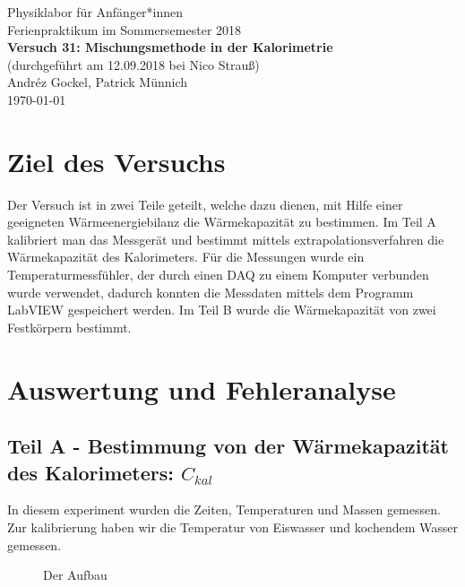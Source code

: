 \documentclass[11pt,a4paper]{article}
\begin{document}
{
\centering 
\large 
Physiklabor für Anf\"anger*innen \\
Ferienpraktikum im Sommersemester 2018 \\[4mm]
\textbf{\LARGE 
Versuch 31: Mischungsmethode in der Kalorimetrie
} \\[3mm]
(durchgef\"uhrt am 12.09.2018 bei Nico Strauß) \\
Andréz Gockel, Patrick M\"unnich\\
\today \\[10mm]
}

\section{Ziel des Versuchs}

Der Versuch ist in zwei Teile geteilt, welche dazu dienen, mit Hilfe einer geeigneten Wärmeenergiebilanz die Wärmekapazität zu bestimmen. Im Teil A kalibriert man das Messgerät und bestimmt mittels extrapolationsverfahren die Wärmekapazität des Kalorimeters. Für die Messungen wurde ein Temperaturmessfühler, der durch einen DAQ zu einem Komputer verbunden wurde verwendet, dadurch konnten die Messdaten mittels dem Programm LabVIEW gespeichert werden. Im Teil B wurde die Wärmekapazität von zwei Festkörpern bestimmt. 

\section{Auswertung und Fehleranalyse}

\subsection{Teil A - Bestimmung von der Wärmekapazität des Kalorimeters: $C_{kal}$}

 In diesem experiment wurden die Zeiten, Temperaturen und Massen gemessen. Zur kalibrierung haben wir die Temperatur von Eiswasser und kochendem Wasser gemessen.

\begin{figure}[h]
	\centering
  	\renewcommand\thefigure{B1}
	\caption{Der Aufbau}
	\label{Bild:1}
\end{figure}
\end{document}
